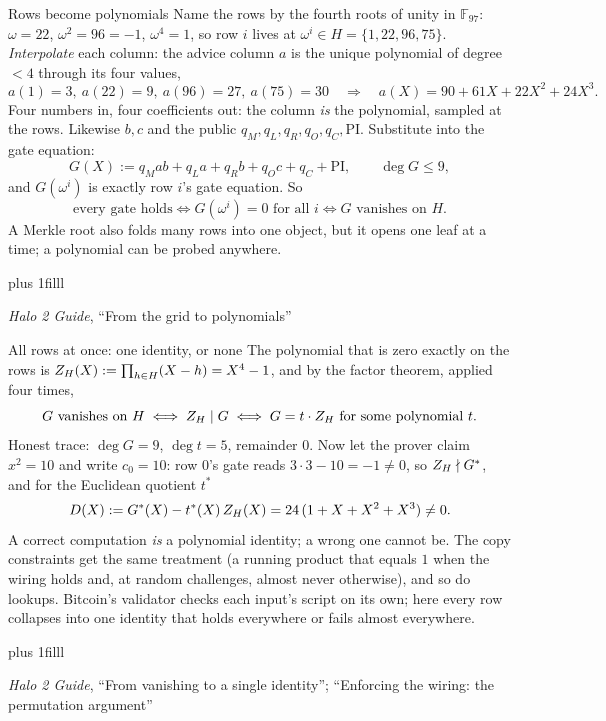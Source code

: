 \documentclass[aspectratio=169,11pt]{beamer}
\newcommand{\F}{\mathbb{F}}
\newcommand{\src}[1]{\par\vskip0pt plus 1filll
  {\fontsize{6}{7.2}\selectfont\color{arbdim}\raggedright #1\par}}
\begin{document}
\begin{frame}{Rows become polynomials}
Name the rows by the fourth roots of unity in $\F_{97}$: $\omega = 22$,
$\omega^2 = 96 = -1$, $\omega^4 = 1$, so row $i$ lives at
$\omega^i \in H = \{1, 22, 96, 75\}$.
\emph{Interpolate} each column: the advice column $a$ is the unique
polynomial of degree $< 4$ through its four values,
\[
a(1) = 3,\ a(22) = 9,\ a(96) = 27,\ a(75) = 30
\quad\Longrightarrow\quad
a(X) = 90 + 61X + 22X^2 + 24X^3 .
\]
Four numbers in, four coefficients out: the column \emph{is} the
polynomial, sampled at the rows. Likewise $b, c$ and the public
$q_M, q_L, q_R, q_O, q_C, \mathrm{PI}$. Substitute into the gate
equation:
\[
G(X) := q_M a b + q_L a + q_R b + q_O c + q_C + \mathrm{PI},
\qquad \deg G \le 9,
\]
and $G(\omega^i)$ is exactly row $i$'s gate equation. So
\[
\text{every gate holds} \iff G(\omega^i) = 0 \text{ for all } i
\iff G \text{ vanishes on } H.
\]
A Merkle root also folds many rows into one object, but it opens one
leaf at a time; a polynomial can be probed anywhere.
\src{\emph{Halo 2 Guide}, ``From the grid to polynomials''}
\end{frame}

\begin{frame}{All rows at once: one identity, or none}
The polynomial that is zero exactly on the rows is $Z_H(X) :=
\prod_{h \in H}(X - h) = X^4 - 1$, and by the factor theorem, applied
four times,
\[
G \text{ vanishes on } H
\iff Z_H \mid G
\iff G = t \cdot Z_H \text{ for some polynomial } t .
\]
Honest trace: $\deg G = 9$, $\deg t = 5$, remainder $0$. Now let the
prover claim $x^2 = 10$ and write $c_0 = 10$: row $0$'s gate reads
$3 \cdot 3 - 10 = -1 \neq 0$, so $Z_H \nmid G^{*}$, and for the
Euclidean quotient $t^{*}$
\[
D(X) := G^{*}(X) - t^{*}(X)\, Z_H(X) = 24\,(1 + X + X^2 + X^3) \neq 0 .
\]
A correct computation \emph{is} a polynomial identity; a wrong one
cannot be. The copy constraints get the same treatment (a running
product that equals $1$ when the wiring holds and, at random challenges,
almost never otherwise), and so do lookups.
Bitcoin's validator checks each input's script on its own; here every
row collapses into one identity that holds everywhere or fails almost
everywhere.
\src{\emph{Halo 2 Guide}, ``From vanishing to a single identity'';
``Enforcing the wiring: the permutation argument''}
\end{frame}
\end{document}
